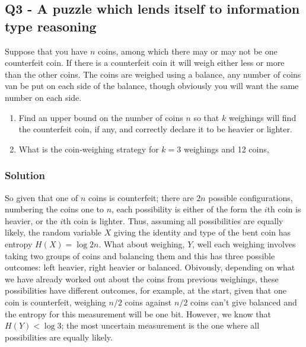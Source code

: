 \documentclass[12pt]{article}
\begin{document}
\subsection*{Q3 - A puzzle which lends itself to information type reasoning}

Suppose that you have $n$ coins, among which there may or may not be
one counterfeit coin. If there is a counterfeit coin it will weigh
either less or more than the other coins. The coins are weighed using
a balance, any number of coins van be put on each side of the balance,
though obviously you will want the same number on each side.
\begin{enumerate}
\item Find an upper bound on the number of coins $n$ so that $k$
  weighings will find the counterfeit coin, if any, and correctly
  declare it to be heavier or lighter.
\item What is the coin-weighing strategy for $k=3$ weighings and 12
  coins,
\end{enumerate}

\subsubsection*{Solution}

So given that one of $n$ coins is counterfeit; there are $2n$
possible configurations, numbering the coins one to $n$, each
possibility is either of the form the $i$th coin is heavier, or the
$i$th coin is lighter. Thus, assuming all possibilities are equally
likely, the random variable $X$ giving the identity and type of the
bent coin has entropy $H(X)=\log{2n}$. What about weighing, $Y$, well
each weighing involves taking two groups of coins and balancing them
and this has three possible outcomes: left heavier, right heavier or
balanced. Obivously, depending on what we have already worked out
about the coins from previous weighings, these possibilities have
different outcomes, for example, at the start, given that one coin is
counterfeit, weighing $n/2$ coins against $n/2$ coins can't give
balanced and the entropy for this measurement will be one
bit. However, we know that $H(Y)<\log{3}$; the most uncertain
measurement is the one where all possibilities are equally likely.
\end{document}
